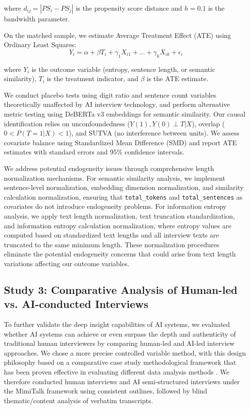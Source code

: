 \documentclass[sigchi,nonacm,manuscript]{acmart}
\begin{document}
where $d_{ij} = |PS_i - PS_j|$ is the propensity score distance and $h = 0.1$ is the bandwidth parameter.

On the matched sample, we estimate Average Treatment Effect (ATE) using Ordinary Least Squares:
\begin{equation}
Y_i = \alpha + \beta T_i + \gamma_1 X_{i1} + ... + \gamma_k X_{ik} + \epsilon_i
\end{equation}

where $Y_i$ is the outcome variable (entropy, sentence length, or semantic similarity), $T_i$ is the treatment indicator, and $\beta$ is the ATE estimate.

We conduct placebo tests using digit ratio and sentence count variables theoretically unaffected by AI interview technology, and perform alternative metric testing using DeBERTa v3 embeddings for semantic similarity. Our causal identification relies on unconfoundedness ($Y(1), Y(0) \perp T | X$), overlap ($0 < P(T = 1 | X) < 1$), and SUTVA (no interference between units). We assess covariate balance using Standardized Mean Difference (SMD) and report ATE estimates with standard errors and 95\% confidence intervals.

We address potential endogeneity issues through comprehensive length normalization mechanisms. For semantic similarity analysis, we implement sentence-level normalization, embedding dimension normalization, and similarity calculation normalization, ensuring that \texttt{total\_tokens} and \texttt{total\_sentences} as covariates do not introduce endogeneity problems. For information entropy analysis, we apply text length normalization, text truncation standardization, and information entropy calculation normalization, where entropy values are computed based on standardized text lengths and all interview texts are truncated to the same minimum length. These normalization procedures eliminate the potential endogeneity concerns that could arise from text length variations affecting our outcome variables.

\subsection{Study 3: Comparative Analysis of Human-led vs. AI-conducted Interviews}

To further validate the deep insight capabilities of AI systems, we evaluated whether AI systems can achieve or even surpass the depth and authenticity of traditional human interviewers by comparing human-led and AI-led interview approaches. We chose a more precise controlled variable method, with this design philosophy based on a comparative case study methodological framework that has been proven effective in evaluating different data analysis methods \citep{akmanHumanResearcherVs2025}. We therefore conducted human interviews and AI semi-structured interviews under the MimiTalk framework using consistent outlines, followed by blind thematic/content analysis of verbatim transcripts.
\end{document}
